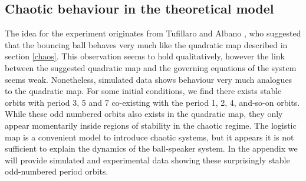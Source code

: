 \documentclass[12pt,oneside,a4paper]{article}
\numberwithin{equation}{section}
\begin{document}
{{{{\subsection{Chaotic behaviour in the theoretical model}
The idea for the experiment originates from Tufillaro and Albano \cite{tufillaro}, who suggested that the bouncing ball behaves very much like the quadratic map described in section \ref{chaos}. This observation seems to hold qualitatively, however the link between the suggested quadratic map and the governing equations of the system seems weak. Nonetheless, simulated data shows behaviour very much analogues to the quadratic map. For some initial conditions, we find there exists stable orbits with period 3, 5 and 7 co-existing with the period 1, 2, 4, and-so-on orbits. While these odd numbered orbits also exists in the quadratic map, they only appear momentarily inside regions of stability in the chaotic regime. The logistic map is a convenient model to introduce chaotic systems, but it appears it is not sufficient to explain the dynamics of the ball-speaker system. In the appendix we will provide simulated and experimental data showing these surprisingly stable odd-numbered period orbits.

}}}}
\end{document}
